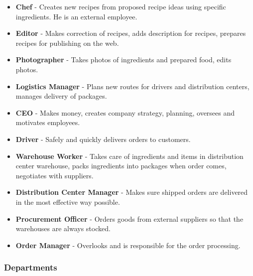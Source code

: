 \documentclass[11pt,a4paper]{article}
\begin{document}
\begin{itemize}
    \item \textbf{Chef} - Creates new recipes from proposed recipe ideas using specific ingredients. He is an external employee.
    \item \textbf{Editor} - Makes correction of recipes, adds description for recipes, prepares recipes for publishing on the web.
    \item \textbf{Photographer} - Takes photos of ingredients and prepared food, edits photos.
    \item \textbf{Logistics Manager} - Plans new routes for drivers and distribution centers, manages delivery of packages.
    \item \textbf{CEO} - Makes money, creates company strategy, planning, oversees and motivates employees.
    \item \textbf{Driver} - Safely and quickly delivers orders to customers.
    \item \textbf{Warehouse Worker} - Takes care of ingredients and items in distribution center warehouse, packs ingredients into packages when order comes, negotiates with suppliers.
    \item \textbf{Distribution Center Manager} - Makes sure shipped orders are delivered in the most effective way possible.
    \item \textbf{Procurement Officer} - Orders goods from external suppliers so that the warehouses are always stocked.
    \item \textbf{Order Manager} - Overlooks and is responsible for the order processing.
\end{itemize}

\subsubsection{Departments}
\end{document}
